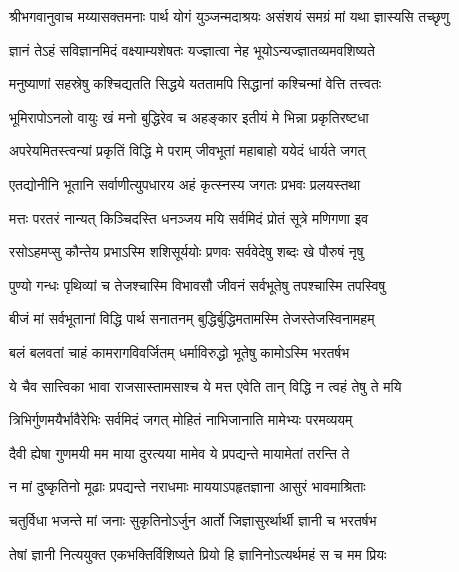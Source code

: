 {श्रीभगवानुवाच}
\twolineshloka
{मय्यासक्तमनाः पार्थ योगं युञ्जन्मदाश्रयः}
{असंशयं समग्रं मां यथा ज्ञास्यसि तच्छृणु}%

\twolineshloka
{ज्ञानं तेऽहं सविज्ञानमिदं वक्ष्याम्यशेषतः}
{यज्ज्ञात्वा नेह भूयोऽन्यज्ज्ञातव्यमवशिष्यते}%

\twolineshloka
{मनुष्याणां सहस्रेषु कश्चिद्यतति सिद्धये}
{यततामपि सिद्धानां कश्चिन्मां वेत्ति तत्त्वतः}%

\twolineshloka
{भूमिरापोऽनलो वायुः खं मनो बुद्धिरेव च}
{अहङ्कार इतीयं मे भिन्ना प्रकृतिरष्टधा}%

\twolineshloka
{अपरेयमितस्त्वन्यां प्रकृतिं विद्धि मे पराम्}
{जीवभूतां महाबाहो ययेदं धार्यते जगत्}%

\twolineshloka
{एतद्योनीनि भूतानि सर्वाणीत्युपधारय}
{अहं कृत्स्नस्य जगतः प्रभवः प्रलयस्तथा}%

\twolineshloka
{मत्तः परतरं नान्यत् किञ्चिदस्ति धनञ्जय}
{मयि सर्वमिदं प्रोतं सूत्रे मणिगणा इव}%

\twolineshloka
{रसोऽहमप्सु कौन्तेय प्रभाऽस्मि शशिसूर्ययोः}
{प्रणवः सर्ववेदेषु शब्दः खे पौरुषं नृषु}%

\twolineshloka
{पुण्यो गन्धः पृथिव्यां च तेजश्चास्मि विभावसौ}
{जीवनं सर्वभूतेषु तपश्चास्मि तपस्विषु}%

\twolineshloka
{बीजं मां सर्वभूतानां विद्धि पार्थ सनातनम्}
{बुद्धिर्बुद्धिमतामस्मि तेजस्तेजस्विनामहम्}%

\twolineshloka
{बलं बलवतां चाहं कामरागविवर्जितम्}
{धर्माविरुद्धो भूतेषु कामोऽस्मि भरतर्षभ}%

\twolineshloka
{ये चैव सात्त्विका भावा राजसास्तामसाश्च ये}
{मत्त एवेति तान् विद्धि न त्वहं तेषु ते मयि}%

\twolineshloka
{त्रिभिर्गुणमयैर्भावैरेभिः सर्वमिदं जगत्}
{मोहितं नाभिजानाति मामेभ्यः परमव्ययम्}%

\twolineshloka
{दैवी ह्येषा गुणमयी मम माया दुरत्यया}
{मामेव ये प्रपद्यन्ते मायामेतां तरन्ति ते}%

\twolineshloka
{न मां दुष्कृतिनो मूढाः प्रपद्यन्ते नराधमाः}
{माययाऽपहृतज्ञाना आसुरं भावमाश्रिताः}%

\twolineshloka
{चतुर्विधा भजन्ते मां जनाः सुकृतिनोऽर्जुन}
{आर्तो जिज्ञासुरर्थार्थी ज्ञानी च भरतर्षभ}%

\twolineshloka
{तेषां ज्ञानी नित्ययुक्त एकभक्तिर्विशिष्यते}
{प्रियो हि ज्ञानिनोऽत्यर्थमहं स च मम प्रियः}%

